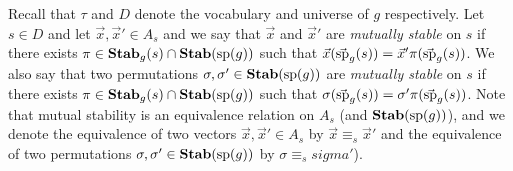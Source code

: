 \documentclass[../paper.tex]{subfiles}
\begin{document}
Recall that $\tau$ and $D$ denote the vocabulary and universe of $g$
respectively. Let $s \in D$ and let $\vec{x}, \vec{x}' \in A_s$ and we say that
$\vec{x}$ and $\vec{x}'$ are \emph{mutually stable} on $s$ if there exists $\pi
\in \text{\textbf{Stab}}_g(s) \cap \text{\textbf{Stab}} (\text{sp} (g))$ such that $\vec{x} (\vec{\text{sp}}_g(s)) =
\vec{x}'\pi (\vec{\text{sp}}_g(s))$. We also say that two permutations $\sigma,
\sigma' \in \text{\textbf{Stab}} (\text{sp} (g))$ are \emph{mutually stable} on $s$ if there exists $\pi
\in \text{\textbf{Stab}}_g(s) \cap \text{\textbf{Stab}} (\text{sp} (g))$ such that $\sigma (\vec{\text{sp}}_g(s)) = \sigma'
\pi (\vec{\text{sp}}_g(s)) $. Note that mutual stability is an equivalence relation
on $A_s$ (and $\text{\textbf{Stab}} (\text{sp} (g))$), and we denote the equivalence of two vectors
$\vec{x}, \vec{x}' \in A_s$ by $\vec{x} \equiv_s \vec{x}'$ and the equivalence
of two permutations $\sigma, \sigma' \in \text{\textbf{Stab}} (\text{sp} (g))$ by $\sigma \equiv_s
sigma'$).





\end{document}
